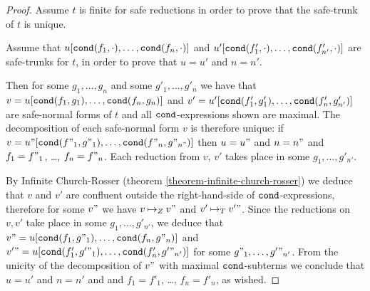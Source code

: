 \begin{proof}
Assume $t$ is finite for safe reductions in order to prove that the safe-trunk of $t$ is unique.

Assume that $u[{\tt cond}(f_1,\cdot), \ldots, {\tt cond}(f_n,\cdot)]$ and
$u'[{\tt cond}(f'_1,\cdot), \ldots, {\tt cond}(f'_{n'},\cdot)]$ are safe-trunks for $t$, in order to prove
that $u=u'$ and $n=n'$. 

Then for some $g_1, \ldots,g_n$ and some $g'_1, \ldots,g'_n$ we have that 
$v = u[{\tt cond}(f_1,g_1), \ldots, {\tt cond}(f_n,g_n)]$ and 
$v' = u'[{\tt cond}(f'_1,g'_1), \ldots, {\tt cond}(f'_n,g'_{n'})]$ 
are safe-normal forms of $t$ and all ${\tt cond}$-expressions shown are maximal. 
The decomposition of each safe-normal form $v$ is therefore unique:
if $v = u"[{\tt cond}(f"_1,g"_1), \ldots, {\tt cond}(f"_n,g"_{n"})]$ then $u=u"$ and $n=n"$
and $f_1=f"_1$, \ldots, $f_n=f"_n$.
Each reduction from $v$, $v'$ takes place in some $g_1, \ldots,g'_{n'}$. 

By Infinite Church-Rosser  
(theorem \ref{theorem-infinite-church-rosser}) we deduce that $v$ and $v'$ are confluent
outside the right-hand-side of ${\tt cond}$-expressions, therefore
for some $v"$ we have $v \mathbin{\mapsto}_Z v"$ and $v' \mathbin{\mapsto}_T v'"$. 
Since the reductions on $v, v'$ take place in some $g_1, \ldots,g'_{n'}$, 
we deduce that $v" = u[{\tt cond}(f_1,g"_1), \ldots, {\tt cond}(f_n,g"_n)]$
and $v'" = u[{\tt cond}(f'_1,g'"_1), \ldots, {\tt cond}(f'_n,g'"_{n'})]$ for some $g"_1, \ldots,g'"_{n'}$.
From the unicity of the decomposition of $v"$
with maximal ${\tt cond}$-subterms we conclude that $u=u'$ and $n=n'$
and and $f_1=f'_1$, \ldots, $f_n=f'_n$, as wished.

\end{proof}
